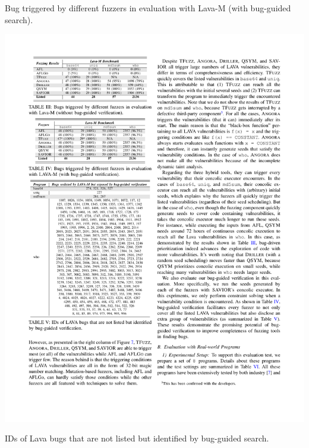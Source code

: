 \begin{table}[h]
	\centering
	\begin{minipage}[b]{0.45\textwidth}
		\centering	
		\caption{Bug triggered by different fuzzers in evaluation with Lava-M (with bug-guided search).}
		\label{tab:lava-bug-num}
		\includegraphics[scale=0.80]{savior/tables/bugguidedsearchlava}
	\end{minipage}
 	\hfill
	\begin{minipage}[b]{0.45\textwidth}
		\centering	
		\caption{IDs of Lava bugs that are not listed but identified by bug-guided search.}
		\label{tab:new-laval-bug-search}

\end{minipage}
\end{table}
